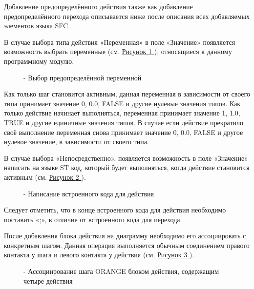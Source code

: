 \documentclass[letterpaper,10pt,russian]{sphinxmanual}
\begin{document}
Добавление предопределённого действия также как добавление
предопределённого перехода описывается ниже после описания всех
добавляемых элементов языка SFC.

В случае выбора типа действия «Переменная» в поле «Значение» появляется
возможность выбрать переменные (см. \hyperref[usage_guide/ide_components:image102]{Рисунок \ref{usage_guide/ide_components:image102} }), относящиеся к данному
программному модулю.
\begin{figure}[htbp]
\centering
\capstart

\noindent{}
\caption{- Выбор предопределённой переменной}\label{usage_guide/ide_components:image102}\end{figure}

Как только шаг становится активным, данная переменная в зависимости от
своего типа принимает значение 0, 0.0, FALSE и другие нулевые значения
типов. Как только действие начинает выполняться, переменная принимает
значение 1, 1.0, TRUE и другие единичные значения типов. В случае если
действие прекратило своё выполнение переменная снова принимает значение
0, 0.0, FALSE и другое нулевое значение, в зависимости от своего типа.

В случае выбора «Непосредственно», появляется возможность в поле
«Значение» написать на языке ST код, который будет выполняться, когда
действие становится активным (см. \hyperref[usage_guide/ide_components:image103]{Рисунок \ref{usage_guide/ide_components:image103} }).
\begin{figure}[htbp]
\centering
\capstart

\noindent{}
\caption{- Написание встроенного кода для действия}\label{usage_guide/ide_components:image103}\end{figure}

Следует отметить, что в конце встроенного кода для действия необходимо
поставить «;», в отличие от встроенного кода для перехода.

После добавления блока действия на диаграмму необходимо его
ассоциировать с конкретным шагом. Данная операция выполняется обычным
соединением правого контакта у шага и левого контакта у действия (см.
\hyperref[usage_guide/ide_components:image104]{Рисунок \ref{usage_guide/ide_components:image104} }).
\begin{figure}[htbp]
\centering
\capstart

\noindent{}
\caption{- Ассоциирование шага ORANGE блоком действия, содержащим четыре действия}\label{usage_guide/ide_components:image104}\end{figure}
\end{document}
